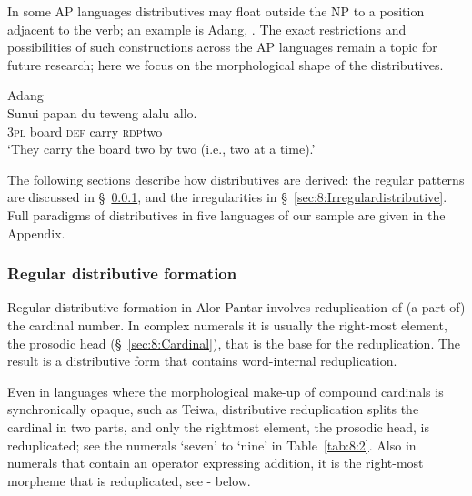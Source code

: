    

  

   

In some AP languages distributives may float outside the NP to a position adjacent to the verb; an example is Adang, . The exact restrictions and possibilities of such constructions across the AP languages remain a topic for future research; here we focus on the morphological shape of the distributives.


\ea
\label{ex:8:1235}
{\upshape Adang}\\
 \gll  Sunui{\textltailn}   papan   du   teweng al{\Tilde}alu  {\ob}allo{\cb}.\\
   3\textsc{pl}    board  \textsc{def}   carry   \textsc{rdp}{\Tilde}two \\
 \glt `They carry the board two by two (i.e., two at a time).'
\z

    

 

 

The following sections describe how distributives are derived: the regular patterns are discussed in {\S}~\ref{sec:8:Regulardistributive}, and the irregularities in {\S}~\ref{sec:8:Irregulardistributive}.  Full paradigms of distributives in five languages of our sample are given in the Appendix.

\subsubsection{Regular distributive formation  }
\label{sec:8:Regulardistributive}






Regular distributive formation in Alor-Pantar involves reduplication of (a part of) the cardinal number. In complex numerals it is usually the right-most element, the prosodic head ({\S}~\ref{sec:8:Cardinal}), that is the base for the reduplication. The result is a distributive form that contains word-internal reduplication. 

Even in languages where the morphological make-up of compound cardinals is synchronically opaque, such as Teiwa, distributive reduplication splits the cardinal in two parts, and only the rightmost element, the prosodic head, is reduplicated; see the numerals `seven' to `nine' in Table~\ref{tab:8:2}. Also in numerals that contain an operator expressing addition, it is the right-most morpheme that is reduplicated, see - below.
 
